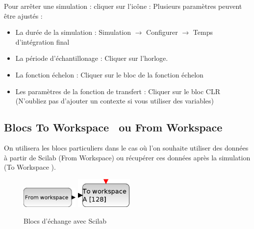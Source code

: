 Pour arrêter une simulation : cliquer sur l'icône : 
Plusieurs paramètres peuvent être ajustés :
\begin{itemize}
    \item La durée de la simulation : Simulation $\rightarrow$ 
          Configurer $\rightarrow$ Temps d'intégration final
    \item La période d'échantillonage : Cliquer sur l'horloge.
    \item La fonction échelon  : Cliquer sur le bloc de la fonction échelon
    \item Les paramètres de la fonction de transfert : Cliquer sur le bloc CLR 
          (N'oubliez pas d'ajouter un contexte si vous utiliser des variables)
\end{itemize}
\subsection{Blocs \og To Workspace \fg~ou \og From Workspace\fg}
On utilisera les blocs particuliers dans le cas où l'on souhaite 
utiliser des données à partir de Scilab (\og From Workspace\fg) 
ou récupérer ces données après la simulation (\og To Workspace \fg).
\begin{figure}[!h]
    \centering
    \includegraphics[width=0.25\textwidth]{fig/FROMWSB.eps}\hspace{3cm}
    \includegraphics[width=0.25\textwidth]{fig/TOWS_c.eps}
    \caption{Blocs d'échange avec Scilab\label{fig-workspace}}
\end{figure}
\newpage
